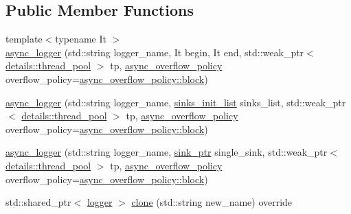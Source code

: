 \subsection*{Public Member Functions}
\begin{DoxyCompactItemize}
\item 
{\footnotesize template$<$typename It $>$ }\\\hyperlink{classspdlog_1_1async__logger_a2a74bf8d8d850ea760396ba8ae55d552}{async\+\_\+logger} (std\+::string logger\+\_\+name, It begin, It end, std\+::weak\+\_\+ptr$<$ \hyperlink{classspdlog_1_1details_1_1thread__pool}{details\+::thread\+\_\+pool} $>$ tp, \hyperlink{namespacespdlog_a42e109759a11c9514d3f6313a7709852}{async\+\_\+overflow\+\_\+policy} overflow\+\_\+policy=\hyperlink{namespacespdlog_a42e109759a11c9514d3f6313a7709852a14511f2f5564650d129ca7cabc333278}{async\+\_\+overflow\+\_\+policy\+::block})
\item 
\hyperlink{classspdlog_1_1async__logger_ad42c05a733917cc7e7b3d9d2ad10a47f}{async\+\_\+logger} (std\+::string logger\+\_\+name, \hyperlink{namespacespdlog_aa9b5c2298bf713fbe02b7e538d797ecd}{sinks\+\_\+init\+\_\+list} sinks\+\_\+list, std\+::weak\+\_\+ptr$<$ \hyperlink{classspdlog_1_1details_1_1thread__pool}{details\+::thread\+\_\+pool} $>$ tp, \hyperlink{namespacespdlog_a42e109759a11c9514d3f6313a7709852}{async\+\_\+overflow\+\_\+policy} overflow\+\_\+policy=\hyperlink{namespacespdlog_a42e109759a11c9514d3f6313a7709852a14511f2f5564650d129ca7cabc333278}{async\+\_\+overflow\+\_\+policy\+::block})
\item 
\hyperlink{classspdlog_1_1async__logger_a99dcf454b74db04fe3300c68baff4d79}{async\+\_\+logger} (std\+::string logger\+\_\+name, \hyperlink{namespacespdlog_a422c57d3088160b517e5a74e5f318253}{sink\+\_\+ptr} single\+\_\+sink, std\+::weak\+\_\+ptr$<$ \hyperlink{classspdlog_1_1details_1_1thread__pool}{details\+::thread\+\_\+pool} $>$ tp, \hyperlink{namespacespdlog_a42e109759a11c9514d3f6313a7709852}{async\+\_\+overflow\+\_\+policy} overflow\+\_\+policy=\hyperlink{namespacespdlog_a42e109759a11c9514d3f6313a7709852a14511f2f5564650d129ca7cabc333278}{async\+\_\+overflow\+\_\+policy\+::block})
\item 
std\+::shared\+\_\+ptr$<$ \hyperlink{classspdlog_1_1logger}{logger} $>$ \hyperlink{classspdlog_1_1async__logger_aef60bc96b78ff98a471dc08977d4cb5c}{clone} (std\+::string new\+\_\+name) override
\end{DoxyCompactItemize}
